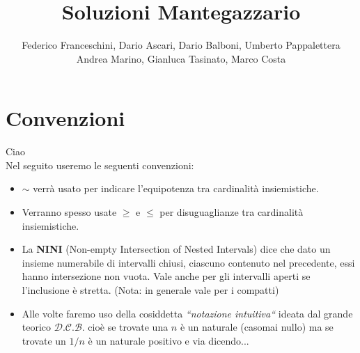 \documentclass[a4paper,11pt]{article}
\title{Soluzioni Mantegazzario}
\author{Federico Franceschini, Dario Ascari, Dario Balboni, Umberto Pappalettera \\ 
Andrea Marino, Gianluca Tasinato, Marco Costa}
\newcommand{\equip}{\sim}
\newcommand{\NINI}{{\bf NINI }}
\begin{document}
\maketitle

\section*{Convenzioni}
Ciao \\
Nel seguito useremo le seguenti convenzioni: \\
\begin{itemize}
\item $\equip$ verr\`a usato per indicare l'equipotenza tra cardinalit\`a insiemistiche.
\item Verranno spesso usate $\ge$ e $\le$ per disuguaglianze tra cardinalit\`a insiemistiche.
\item La \NINI (Non-empty Intersection of Nested Intervals) dice che dato un insieme numerabile di intervalli chiusi, ciascuno contenuto nel precedente, essi hanno intersezione non vuota. Vale anche per gli intervalli aperti se l'inclusione \`e stretta. (Nota: in generale vale per i compatti)
\item Alle volte faremo uso della cosiddetta {\it ``notazione intuitiva``} ideata dal grande teorico $\mathcal{D}$.$\mathcal{C}$.$\mathcal{B}$. cioè se trovate una $n$ è un naturale (casomai nullo) ma se trovate un $1/n$ è un naturale positivo e via dicendo... 
\end{itemize}
\end{document}
